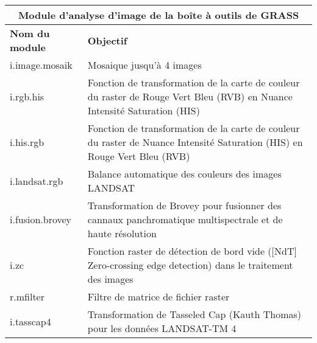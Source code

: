 \begin{table}[H]
\centering
 \begin{tabular}{|p{4cm}|p{10cm}|}
  \hline \multicolumn{2}{|c|}{\textbf{Module d'analyse d'image de la boîte à outils de GRASS}} \\
  \hline \textbf{Nom du module} & \textbf{Objectif} \\
  \hline i.image.mosaik & Mosaique jusqu'à 4 images\\
  \hline i.rgb.his & Fonction de transformation de la carte de couleur du raster de Rouge Vert Bleu (RVB) en Nuance Intensité Saturation (HIS)\\
  \hline i.his.rgb & Fonction de transformation de la carte de couleur du raster de Nuance Intensité Saturation (HIS) en Rouge Vert Bleu (RVB) \\
  \hline i.landsat.rgb & Balance automatique des couleurs des images LANDSAT \\
  \hline i.fusion.brovey & Transformation de Brovey pour fusionner des cannaux panchromatique multispectrale et de haute résolution\\
  \hline i.zc & Fonction raster de détection de bord vide ([NdT] Zero-crossing edge detection) dans le traitement des images \\
  \hline r.mfilter &  Filtre de matrice de fichier raster \\
  \hline i.tasscap4 & Transformation de Tasseled Cap (Kauth Thomas) pour les données LANDSAT-TM 4 \\

\end{tabular}
\end{table}
